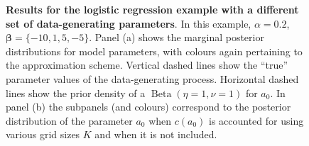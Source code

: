 \documentclass[a4paper, notitlepage, 11pt]{article}
\begin{document}
\begin{figure}[!ht]
\hfill
{}
\hfill
{}
\hfill
\caption{\textbf{Results for the logistic regression example with a different set of data-generating parameters}.
In this example, $\alpha = 0.2$, $\boldsymbol\beta = \{ -10, 1, 5, -5\}$.
Panel (a) shows the marginal posterior distributions for model parameters, with colours again pertaining to the approximation scheme.
Vertical dashed lines show the ``true'' parameter values of the data-generating process.
Horizontal dashed lines show the prior density of a $\operatorname{Beta}(\eta = 1, \nu = 1)$ for $a_0$.
In panel (b) the subpanels (and colours) correspond to the posterior distribution of the parameter $a_0$ when $c(a_0)$ is accounted for using various grid sizes $K$ and when it is not included.
}
\label{sfig:logistic_regression_extra}
\end{figure}
\end{document}
